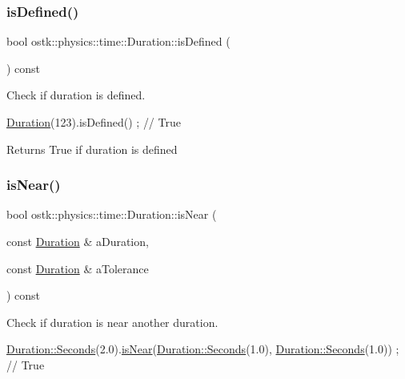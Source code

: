 \subsubsection{\texorpdfstring{is\+Defined()}{isDefined()}}
{\footnotesize\ttfamily bool ostk\+::physics\+::time\+::\+Duration\+::is\+Defined (\begin{DoxyParamCaption}{ }\end{DoxyParamCaption}) const}



Check if duration is defined. 


\begin{DoxyCode}
\hyperlink{classostk_1_1physics_1_1time_1_1_duration_a6ba3a020742ca6e3bf0b1970dd039c07}{Duration}(123).isDefined() ; \textcolor{comment}{// True}
\end{DoxyCode}


\begin{DoxyReturn}{Returns}
True if duration is defined 
\end{DoxyReturn}
\mbox{\label{classostk_1_1physics_1_1time_1_1_duration_a89fe2dee0dec4b81040ecc7a31bb3f87}} 
\subsubsection{\texorpdfstring{is\+Near()}{isNear()}}
{\footnotesize\ttfamily bool ostk\+::physics\+::time\+::\+Duration\+::is\+Near (\begin{DoxyParamCaption}\item[{const \hyperlink{classostk_1_1physics_1_1time_1_1_duration}{Duration} \&}]{a\+Duration,  }\item[{const \hyperlink{classostk_1_1physics_1_1time_1_1_duration}{Duration} \&}]{a\+Tolerance }\end{DoxyParamCaption}) const}



Check if duration is near another duration. 


\begin{DoxyCode}
\hyperlink{classostk_1_1physics_1_1time_1_1_duration_ad973fa34fcc308fdcc8d50c3ee694764}{Duration::Seconds}(2.0).\hyperlink{classostk_1_1physics_1_1time_1_1_duration_a89fe2dee0dec4b81040ecc7a31bb3f87}{isNear}(\hyperlink{classostk_1_1physics_1_1time_1_1_duration_ad973fa34fcc308fdcc8d50c3ee694764}{Duration::Seconds}(1.0), 
      \hyperlink{classostk_1_1physics_1_1time_1_1_duration_ad973fa34fcc308fdcc8d50c3ee694764}{Duration::Seconds}(1.0)) ; \textcolor{comment}{// True}
\end{DoxyCode}



